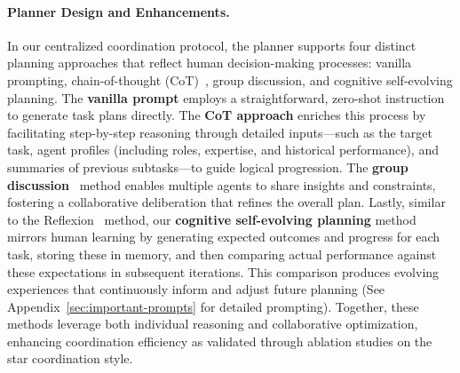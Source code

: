 
\paragraph{Planner Design and Enhancements.}
In our centralized coordination protocol, the planner supports four distinct planning approaches that reflect human decision-making processes: vanilla prompting, chain-of-thought (CoT)~\citep{wei2022chain}, group discussion, and cognitive self-evolving planning. The \textbf{vanilla prompt} employs a straightforward, zero-shot instruction to generate task plans directly. The \textbf{CoT approach} enriches this process by facilitating step-by-step reasoning through detailed inputs—such as the target task, agent profiles (including roles, expertise, and historical performance), and summaries of previous subtasks—to guide logical progression. The \textbf{group discussion}~\citep{chen2023agentversefacilitatingmultiagentcollaboration} method enables multiple agents to share insights and constraints, fostering a collaborative deliberation that refines the overall plan. Lastly, similar to the Reflexion~\citep{shinn2023reflexion} method, our \textbf{cognitive self-evolving planning} method mirrors human learning by generating expected outcomes and progress for each task, storing these in memory, and then comparing actual performance against these expectations in subsequent iterations. This comparison produces evolving experiences that continuously inform and adjust future planning (See Appendix~\ref{sec:important-prompts} for detailed prompting). Together, these methods leverage both individual reasoning and collaborative optimization, enhancing coordination efficiency as validated through ablation studies on the star coordination style.





